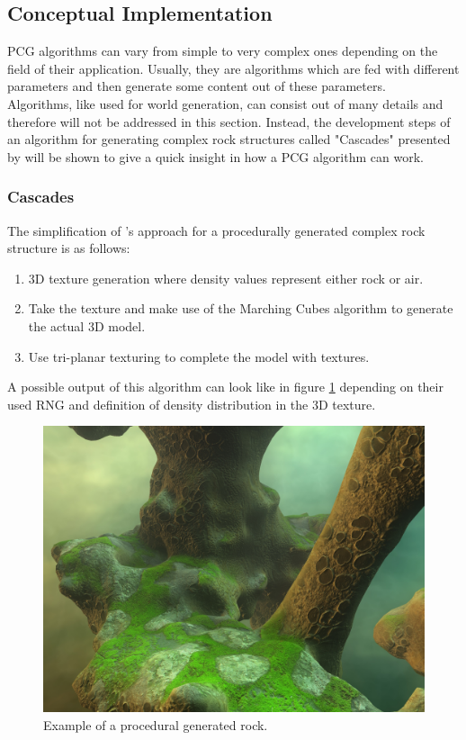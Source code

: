 \documentclass[MGS,Master,english]{twbook}%
\begin{document}
\subsection{Conceptual Implementation}
PCG algorithms can vary from simple to very complex ones depending on the field of their application. Usually, they are algorithms which are fed with different parameters and then generate some content out of these parameters.\\
Algorithms, like used for world generation, can consist out of many details and therefore will not be addressed in this section. Instead, the development steps of an algorithm for generating complex rock structures called "Cascades" presented by \cite{nvidia::cascades} will be shown to give a quick insight in how a PCG algorithm can work.

\subsubsection{Cascades}
The simplification of 's approach for a procedurally generated complex rock structure is as follows:
\begin{enumerate}
	\item 3D texture generation where density values represent either rock or air.
	\item Take the texture and make use of the Marching Cubes algorithm to generate the actual 3D model.
	\item Use tri-planar texturing to complete the model with textures.
\end{enumerate}
A possible output of this algorithm can look like in figure \ref{cascadesFigure} depending on their used \ac{RNG} and definition of density distribution in the 3D texture. 
\begin{figure}[!htbp]
	\centering
	\includegraphics[width=0.5\linewidth]{PICs/cascades}
	\caption{Example of a procedural generated rock. \protect\cite{nvidia::cascades}}\label{cascadesFigure}
\end{figure}
\end{document}
